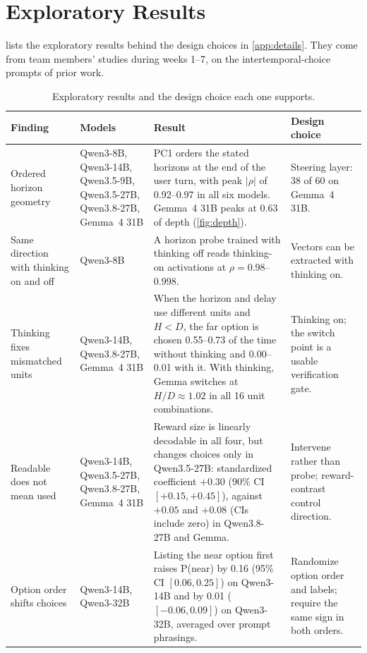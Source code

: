 \documentclass[midterm]{sparreport}
\begin{document}
\clearpage
\section{Exploratory Results}
\label{app:exploratory}

 lists the exploratory results behind the design choices in \cref{app:details}. They come from team members' studies during weeks 1--7, on the intertemporal-choice prompts of prior work.

\begin{table}[htbp]
  \centering
  \caption{Exploratory results and the design choice each one supports.}
  \label{tab:exploratory}
  \small
  \begin{tabular}{L{1.0in}L{1.05in}L{2.4in}L{1.35in}}
    \toprule
    \textbf{Finding} & \textbf{Models} & \textbf{Result} & \textbf{Design choice} \\
    \midrule
    Ordered horizon geometry & Qwen3-8B, Qwen3-14B, Qwen3.5-9B, Qwen3.5-27B, Qwen3.8-27B, Gemma~4 31B & PC1 orders the stated horizons at the end of the user turn, with peak $|\rho|$ of 0.92--0.97 in all six models. Gemma~4 31B peaks at 0.63 of depth (\cref{fig:depth}). & Steering layer: 38 of 60 on Gemma~4 31B. \\
    \addlinespace
    Same direction with thinking on and off & Qwen3-8B & A horizon probe trained with thinking off reads thinking-on activations at $\rho = 0.98$--$0.998$. & Vectors can be extracted with thinking on. \\
    \addlinespace
    Thinking fixes mismatched units & Qwen3-14B, Qwen3.8-27B, Gemma~4 31B & When the horizon and delay use different units and $H < D$, the far option is chosen 0.55--0.73 of the time without thinking and 0.00--0.01 with it. With thinking, Gemma switches at $H/D \approx 1.02$ in all 16 unit combinations. & Thinking on; the switch point is a usable verification gate. \\
    \addlinespace
    Readable does not mean used & Qwen3-14B, Qwen3.5-27B, Qwen3.8-27B, Gemma~4 31B & Reward size is linearly decodable in all four, but changes choices only in Qwen3.5-27B: standardized coefficient $+0.30$ (90\% CI $[+0.15, +0.45]$), against $+0.05$ and $+0.08$ (CIs include zero) in Qwen3.8-27B and Gemma. & Intervene rather than probe; reward-contrast control direction. \\
    \addlinespace
    Option order shifts choices & Qwen3-14B, Qwen3-32B & Listing the near option first raises P(near) by 0.16 (95\% CI $[0.06, 0.25]$) on Qwen3-14B and by 0.01 ($[-0.06, 0.09]$) on Qwen3-32B, averaged over prompt phrasings. & Randomize option order and labels; require the same sign in both orders. \\
    \bottomrule
  \end{tabular}
\end{table}
\end{document}
